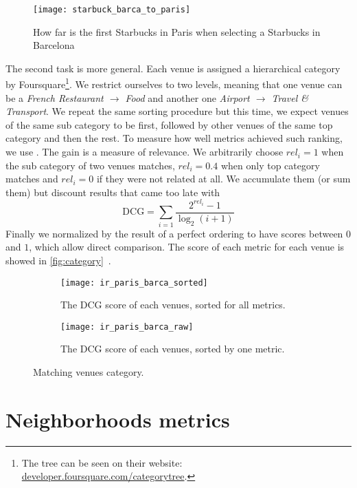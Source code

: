 \begin{figure}[h]
        \centering
        \texttt{[image: starbuck\_barca\_to\_paris]}
        \caption{How far is the first Starbucks in Paris when selecting a
        Starbucks in Barcelona}
        \label{fig:brand}
\end{figure}

The second task is more general. Each venue is assigned a hierarchical category
by Foursquare\footnote{The tree can be seen on their website:
\href{https://developer.foursquare.com/categorytree}{%
\url{developer.foursquare.com/categorytree}}.}. We restrict ourselves
to two levels, meaning that one venue can be a \emph{French Restaurant
$\rightarrow$ Food} and another one \emph{Airport $\rightarrow$ Travel
\& Transport}. We repeat the same sorting procedure but this time, we expect
venues of the same sub category to be first, followed by other venues of the
same top category and then the rest. To measure how well metrics achieved such
ranking, we use 
\autocite{IREvaluation07}. The gain is a measure of relevance. We arbitrarily
choose $rel_i=1$ when the sub category of two venues matches, $rel_i=0.4$ when
only top category matches and $rel_i=0$ if they were not related at all. We
accumulate them (or sum them) but discount results that came too late with \[
\mathrm{DCG} = \sum_{i=1} \frac{ 2^{rel_{i}} - 1 }{ \log_{2}(i+1)} \]
Finally we normalized by the result of a perfect ordering to have scores
between $0$ and $1$, which allow direct comparison. The score of each metric
for each venue is showed in \autoref{fig:category}~.

\begin{figure}[h]
    \begin{subfigure}[b]{\textwidth}
        \centering
        \texttt{[image: ir\_paris\_barca\_sorted]}
        \caption{The DCG score of each venues, sorted for all metrics.}
    \end{subfigure}

    \begin{subfigure}[b]{\textwidth}
        \centering
        \texttt{[image: ir\_paris\_barca\_raw]}
        \caption{The DCG score of each venues, sorted by one metric.}
    \end{subfigure}
    \caption{Matching venues category.\label{fig:category}}
\end{figure}

\section{Neighborhoods metrics}
\label{sec:regions-metrics}

